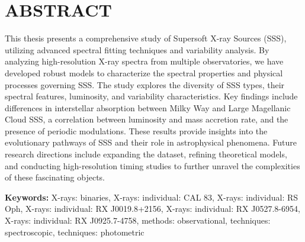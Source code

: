 \chapter*{ABSTRACT}
    
    This thesis presents a comprehensive study of Supersoft X-ray Sources (SSS), utilizing advanced spectral fitting techniques and variability analysis. By analyzing high-resolution X-ray spectra from multiple observatories, we have developed robust models to characterize the spectral properties and physical processes governing SSS. The study explores the diversity of SSS types, their spectral features, luminosity, and variability characteristics. Key findings include differences in interstellar absorption between Milky Way and Large Magellanic Cloud SSS, a correlation between luminosity and mass accretion rate, and the presence of periodic modulations. These results provide insights into the evolutionary pathways of SSS and their role in astrophysical phenomena. Future research directions include expanding the dataset, refining theoretical models, and conducting high-resolution timing studies to further unravel the complexities of these fascinating objects.
    
    \textbf{Keywords:} X-rays: binaries, X-rays: individual: CAL 83, X-rays: individual: RS Oph, X-rays: individual: RX J0019.8+2156, X-rays: individual: RX J0527.8-6954, X-rays: individual: RX J0925.7-4758, methods: observational, techniques: spectroscopic, techniques: photometric
